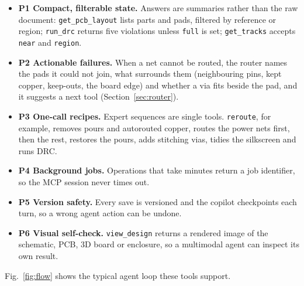 \documentclass[journal]{IEEEtran}
\newcommand{\tool}[1]{\texttt{\small #1}}
\begin{document}
\begin{itemize}\setlength{\itemsep}{1pt}
\item[] \textbf{P1 Compact, filterable state.} Answers are summaries rather than the raw document: \tool{get\_pcb\_layout} lists parts and pads, filtered by reference or region; \tool{run\_drc} returns five violations unless \texttt{full} is set; \tool{get\_tracks} accepts \texttt{near} and \texttt{region}.
\item[] \textbf{P2 Actionable failures.} When a net cannot be routed, the router names the pads it could not join, what surrounds them (neighbouring pins, kept copper, keep-outs, the board edge) and whether a via fits beside the pad, and it suggests a next tool (Section~\ref{sec:router}).
\item[] \textbf{P3 One-call recipes.} Expert sequences are single tools. \tool{reroute}, for example, removes pours and autorouted copper, routes the power nets first, then the rest, restores the pours, adds stitching vias, tidies the silkscreen and runs DRC.
\item[] \textbf{P4 Background jobs.} Operations that take minutes return a job identifier, so the MCP session never times out.
\item[] \textbf{P5 Version safety.} Every save is versioned and the copilot checkpoints each turn, so a wrong agent action can be undone.
\item[] \textbf{P6 Visual self-check.} \tool{view\_design} returns a rendered image of the schematic, PCB, 3D board or enclosure, so a multimodal agent can inspect its own result.
\end{itemize}

Fig.~\ref{fig:flow} shows the typical agent loop these tools support.
\end{document}
